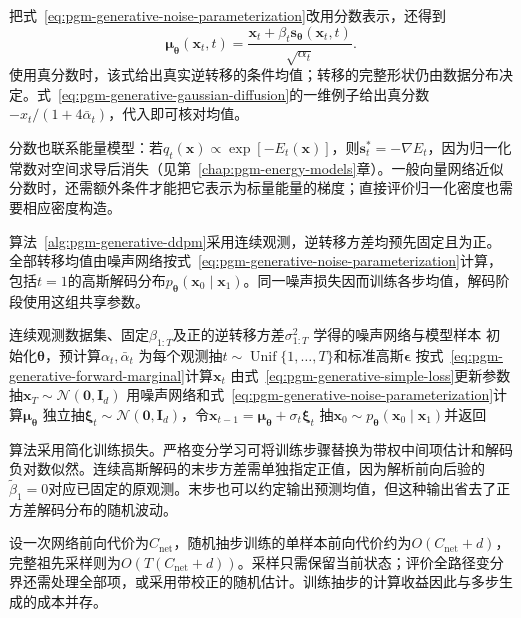 把式~\eqref{eq:pgm-generative-noise-parameterization}改用分数表示，还得到
\[
  \bm{\mu}_{\bm{\theta}}(\bm{x}_t,t)
    =\frac{\bm{x}_t+\beta_t\bm{s}_{\bm{\theta}}(\bm{x}_t,t)}
            {\sqrt{\alpha_t}}.
\]
使用真分数时，该式给出真实逆转移的条件均值；转移的完整形状仍由数据分布决定。式~\eqref{eq:pgm-generative-gaussian-diffusion}的一维例子给出真分数$-x_t/(1+4\bar{\alpha}_t)$，代入即可核对均值。

分数也联系能量模型：若$q_t(\bm{x})\propto\exp[-E_t(\bm{x})]$，则$\bm{s}_t^*=-\nabla E_t$，因为归一化常数对空间求导后消失（见第~\ref{chap:pgm-energy-models}章）。一般向量网络近似分数时，还需额外条件才能把它表示为标量能量的梯度；直接评价归一化密度也需要相应密度构造。

算法~\ref{alg:pgm-generative-ddpm}采用连续观测，逆转移方差均预先固定且为正。全部转移均值由噪声网络按式~\eqref{eq:pgm-generative-noise-parameterization}计算，包括$t=1$的高斯解码分布$p_{\bm{\theta}}(\bm{x}_0\mid\bm{x}_1)$。同一噪声损失因而训练各步均值，解码阶段使用这组共享参数。

\begin{algorithm}[固定方差DDPM的学习与祖先采样]
  \label{alg:pgm-generative-ddpm}
  \begin{algorithmic}[1]
    \Require 连续观测数据集、固定$\beta_{1:T}$及正的逆转移方差$\sigma_{1:T}^2$
    \Ensure 学得的噪声网络与模型样本
    \State 初始化$\bm{\theta}$，预计算$\alpha_t,\bar{\alpha}_t$
      \State 为每个观测抽$t\sim\operatorname{Unif}\{1,\ldots,T\}$和标准高斯$\bm{\epsilon}$
      \State 按式~\eqref{eq:pgm-generative-forward-marginal}计算$\bm{x}_t$
      \State 由式~\eqref{eq:pgm-generative-simple-loss}更新参数
    \EndFor
    \State 抽$\bm{x}_T\sim\mathcal{N}(\bm{0},\bm{I}_d)$
      \State 用噪声网络和式~\eqref{eq:pgm-generative-noise-parameterization}计算$\bm{\mu}_{\bm{\theta}}$
      \State 独立抽$\bm{\xi}_t\sim\mathcal{N}(\bm{0},\bm{I}_d)$，令$\bm{x}_{t-1}=\bm{\mu}_{\bm{\theta}}+\sigma_t\bm{\xi}_t$
    \EndFor
    \State 抽$\bm{x}_0\sim p_{\bm{\theta}}(\bm{x}_0\mid\bm{x}_1)$并返回
  \end{algorithmic}
\end{algorithm}

算法采用简化训练损失。严格变分学习可将训练步骤替换为带权中间项估计和解码负对数似然。连续高斯解码的末步方差需单独指定正值，因为解析前向后验的$\widetilde{\beta}_1=0$对应已固定的原观测。末步也可以约定输出预测均值，但这种输出省去了正方差解码分布的随机波动。

设一次网络前向代价为$C_{\mathrm{net}}$，随机抽步训练的单样本前向代价约为$O(C_{\mathrm{net}}+d)$，完整祖先采样则为$O(T(C_{\mathrm{net}}+d))$。采样只需保留当前状态；评价全路径变分界还需处理全部项，或采用带校正的随机估计。训练抽步的计算收益因此与多步生成的成本并存。

